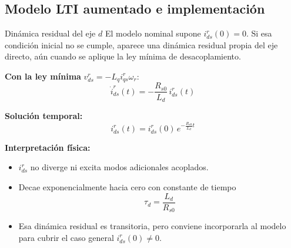 \documentclass[aspectratio=169,t]{beamer}
\begin{document}
\subsection{Modelo LTI aumentado e implementación}

\begin{frame}{Dinámica residual del eje $d$}
{\small\color{uncGray}El modelo nominal supone $i_{ds}^r(0)=0$. Si esa condición inicial no se cumple, aparece una dinámica residual propia del eje directo, aún cuando se aplique la ley mínima de desacoplamiento.}\par
\vspace{3mm}

\textbf{Con la ley mínima} $v_{ds}^{r}=-L_q i_{qs}^{r}\omega_r$:
\begin{equation*}
\dot{i}_{ds}^{r}(t)= -\frac{R_{s0}}{L_d}\,i_{ds}^{r}(t)
\end{equation*}

\textbf{Solución temporal:}
\begin{equation*}
i_{ds}^{r}(t)=i_{ds}^{r}(0)\,e^{-\frac{R_{s0}}{L_d}t}
\end{equation*}

\textbf{Interpretación física:}
\begin{itemize}
  \item $i_{ds}^{r}$ no diverge ni excita modos adicionales acoplados.
  \item Decae exponencialmente hacia cero con constante de tiempo
  \[
  \tau_d=\frac{L_d}{R_{s0}}
  \]
  \item Esa dinámica residual es transitoria, pero conviene incorporarla al modelo para cubrir el caso general $i_{ds}^r(0)\neq 0$.
\end{itemize}
\end{frame}
\end{document}

